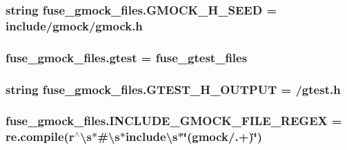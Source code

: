 \subsubsection[{\texorpdfstring{G\+M\+O\+C\+K\+\_\+\+H\+\_\+\+S\+E\+ED}{GMOCK_H_SEED}}]{\setlength{\rightskip}{0pt plus 5cm}string fuse\+\_\+gmock\+\_\+files.\+G\+M\+O\+C\+K\+\_\+\+H\+\_\+\+S\+E\+ED = \textquotesingle{}include/gmock/gmock.\+h\textquotesingle{}}\hypertarget{namespacefuse__gmock__files_aa31b816a9048fb3fa9d482eeac69c139}{}\label{namespacefuse__gmock__files_aa31b816a9048fb3fa9d482eeac69c139}
\subsubsection[{\texorpdfstring{gtest}{gtest}}]{\setlength{\rightskip}{0pt plus 5cm}fuse\+\_\+gmock\+\_\+files.\+gtest = fuse\+\_\+gtest\+\_\+files}\hypertarget{namespacefuse__gmock__files_a3fb36dbe8d361f9ecc54e1aa4b94b068}{}\label{namespacefuse__gmock__files_a3fb36dbe8d361f9ecc54e1aa4b94b068}
\subsubsection[{\texorpdfstring{G\+T\+E\+S\+T\+\_\+\+H\+\_\+\+O\+U\+T\+P\+UT}{GTEST_H_OUTPUT}}]{\setlength{\rightskip}{0pt plus 5cm}string fuse\+\_\+gmock\+\_\+files.\+G\+T\+E\+S\+T\+\_\+\+H\+\_\+\+O\+U\+T\+P\+UT = /gtest.\+h\textquotesingle{}}\hypertarget{namespacefuse__gmock__files_a385c31d8542b0a2e4b7f46cb2a32d7da}{}\label{namespacefuse__gmock__files_a385c31d8542b0a2e4b7f46cb2a32d7da}
\subsubsection[{\texorpdfstring{I\+N\+C\+L\+U\+D\+E\+\_\+\+G\+M\+O\+C\+K\+\_\+\+F\+I\+L\+E\+\_\+\+R\+E\+G\+EX}{INCLUDE_GMOCK_FILE_REGEX}}]{\setlength{\rightskip}{0pt plus 5cm}fuse\+\_\+gmock\+\_\+files.\+I\+N\+C\+L\+U\+D\+E\+\_\+\+G\+M\+O\+C\+K\+\_\+\+F\+I\+L\+E\+\_\+\+R\+E\+G\+EX = re.\+compile(r\textquotesingle{}$^\wedge$\textbackslash{}s$\ast$\#\textbackslash{}s$\ast$include\textbackslash{}s$\ast$\char`\"{}(gmock/.+)\char`\"{}\textquotesingle{})}\hypertarget{namespacefuse__gmock__files_aeb4457451f878d6bc8a42f7ff3e5f6cf}{}\label{namespacefuse__gmock__files_aeb4457451f878d6bc8a42f7ff3e5f6cf}
